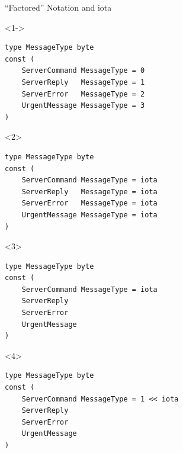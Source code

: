 \documentclass[pdf]{beamer}
\begin{document}
\begin{frame}[fragile]{``Factored'' Notation and iota}
\begin{onlyenv}<1->
\begin{lstlisting}
type MessageType byte
const (
    ServerCommand MessageType = 0
    ServerReply   MessageType = 1
    ServerError   MessageType = 2
    UrgentMessage MessageType = 3
)
\end{lstlisting}
\end{onlyenv}
\vfill\strut
\begin{onlyenv}<2>
\begin{lstlisting}
type MessageType byte
const (
    ServerCommand MessageType = iota
    ServerReply   MessageType = iota
    ServerError   MessageType = iota
    UrgentMessage MessageType = iota
)
\end{lstlisting}
\end{onlyenv}
\begin{onlyenv}<3>
\begin{lstlisting}
type MessageType byte
const (
    ServerCommand MessageType = iota
    ServerReply   
    ServerError   
    UrgentMessage 
)
\end{lstlisting}
\end{onlyenv}
\begin{onlyenv}<4>
\begin{lstlisting}
type MessageType byte
const (
    ServerCommand MessageType = 1 << iota
    ServerReply   
    ServerError   
    UrgentMessage 
)
\end{lstlisting}
\end{onlyenv}
\end{frame}
\end{document}
